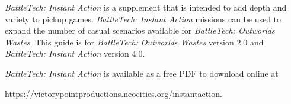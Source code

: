 \emph{BattleTech: Instant Action} is a supplement that is intended to add depth and variety to pickup games.
\emph{BattleTech: Instant Action} missions can be used to expand the number of casual scenarios available for \emph{BattleTech: Outworlds Wastes}.
This guide is for \emph{BattleTech: Outworlds Wastes} version 2.0 and \emph{BattleTech: Instant Action} version 4.0.

\emph{BattleTech: Instant Action} is available as a free PDF to download online at

 \href{https://victorypointproductions.neocities.org/instantaction}{https://victorypointproductions.neocities.org/instantaction}.
